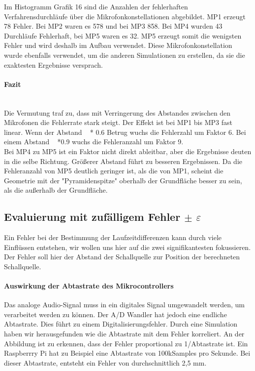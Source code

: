 Im Histogramm Grafik 16 sind die Anzahlen der fehlerhaften Verfahrensdurchläufe über die Mikrofonkonstellationen abgebildet. MP1 erzeugt 78 Fehler. Bei MP2 waren es 578 und bei MP3 858. Bei MP4 wurden 43 Durchläufe Fehlerhaft, bei MP5 waren es 32. MP5 erzeugt somit die wenigsten Fehler und wird deshalb im Aufbau verwendet. Diese Mikrofonkonstellation wurde ebenfalls verwendet, um die anderen Simulationen zu erstellen, da sie die exaktesten Ergebnisse versprach.
\paragraph{Fazit}\ \\
Die Vermutung traf zu, dass mit Verringerung des Abstandes zwischen den Mikrofonen die Fehlerrate stark steigt. Der Effekt ist bei MP1 bis MP3 fast linear. Wenn der Abstand ~ * 0.6 Betrug wuchs die Fehlerzahl um Faktor 6. Bei einem Abstand ~ *0.9 wuchs die Fehleranzahl um Faktor 9. \\
Bei MP4 zu MP5 ist ein Faktor nicht direkt ableitbar, aber die Ergebnisse deuten in die selbe Richtung. Größerer Abstand führt zu besseren Ergebnissen.
Da die Fehleranzahl von MP5 deutlich geringer ist, als die von MP1, scheint die Geometrie mit der "Pyramidenspitze" oberhalb der Grundfläche besser zu sein, als die außerhalb der Grundfläche.
\subsection{Evaluierung mit zufälligem Fehler $\pm$ $\varepsilon$}
Ein Fehler bei der Bestimmung der Laufzeitdifferenzen kann durch viele Einflüssen entstehen, wir wollen uns hier auf die zwei signifikantesten fokussieren. Der Fehler soll hier der Abstand der Schallquelle zur Position der berechneten Schallquelle.
\paragraph{Auswirkung der Abtastrate des Mikrocontrollers}
Das analoge Audio-Signal muss in ein digitales Signal umgewandelt werden, um verarbeitet werden zu können. Der A/D Wandler hat jedoch eine endliche Abtastrate. Dies führt zu einem Digitalisierungsfehler. Durch eine Simulation haben wir herausgefunden wie die Abtastrate mit dem Fehler korreliert. An der Abbildung ist zu erkennen, dass der Fehler proportional zu 1/Abtastrate ist. Ein Raspberrry Pi hat zu Beispiel eine Abtastrate von 100kSamples pro Sekunde. Bei dieser Abtastrate, entsteht ein Fehler von durchschnittlich 2,5 mm.

